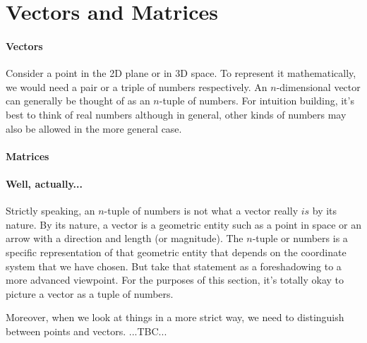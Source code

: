 \section{Vectors and Matrices}

\paragraph{Vectors}
Consider a point in the 2D plane or in 3D space. To represent it mathematically, we would need a pair or a triple of numbers respectively. An $n$-dimensional vector can generally be thought of as an $n$-tuple of numbers. For intuition building, it's best to think of real numbers although in general, other kinds of numbers may also be allowed in the more general case. 


\paragraph{Matrices}


\paragraph{Well, actually...}
Strictly speaking, an $n$-tuple of numbers is not what a vector really $is$ by its nature. By its nature, a vector is a geometric entity such as a point in space or an arrow with a direction and length (or magnitude). The $n$-tuple or numbers is a specific representation of that geometric entity that depends on the coordinate system that we have chosen. But take that statement as a foreshadowing to a more advanced viewpoint. For the purposes of this section, it's totally okay to picture a vector as a tuple of numbers.

\medskip
Moreover, when we look at things in a more strict way, we need to distinguish between points and vectors. ...TBC...





